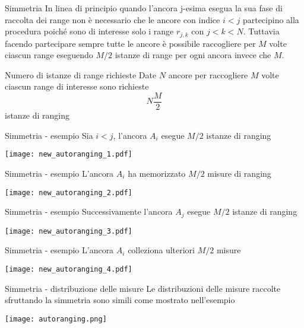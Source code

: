 \begin{frame}{Simmetria}
  In linea di principio quando l'ancora j-esima esegua la sua fase di raccolta dei range non è
  necessario che le ancore con indice $i < j$ partecipino alla procedura poiché sono di interesse solo
  i range $r_{j,k}$ con $j < k < N$. Tuttavia facendo partecipare sempre tutte le ancore è possibile
  raccogliere per $M$ volte ciascun range eseguendo $M/2$ istanze di range per ogni ancora invece che $M$.

  \begin{exampleblock}{Numero di istanze di range richieste}
    Date $N$ ancore per raccogliere $M$ volte ciascun range di interesse sono richieste
    \[
    N \frac{M}{2}
    \]
    istanze di ranging
  \end{exampleblock}
\end{frame}

\begin{frame}{Simmetria - esempio}
  Sia $i<j$, l'ancora $A_i$ esegue $M/2$ istanze di ranging
  \begin{center}
    \texttt{[image: new\_autoranging\_1.pdf]}
  \end{center}
\end{frame}

\begin{frame}{Simmetria - esempio}
  L'ancora $A_i$ ha memorizzato $M/2$ misure di ranging
  \begin{center}
    \texttt{[image: new\_autoranging\_2.pdf]}
  \end{center}
\end{frame}

\begin{frame}{Simmetria - esempio}
  Successivamente l'ancora $A_j$ esegue $M/2$ istanze di ranging
  \begin{center}
    \texttt{[image: new\_autoranging\_3.pdf]}
  \end{center}
\end{frame}

\begin{frame}{Simmetria - esempio}
  L'ancora $A_i$ colleziona ulteriori $M/2$ misure
  \begin{center}
    \texttt{[image: new\_autoranging\_4.pdf]}
  \end{center}
\end{frame}

\begin{frame}{Simmetria - distribuzione delle misure}
  Le distribuzioni delle misure raccolte sfruttando la simmetria sono simili come mostrato nell'esempio 
  \begin{center}
    \texttt{[image: autoranging.png]}
  \end{center}
\end{frame}

